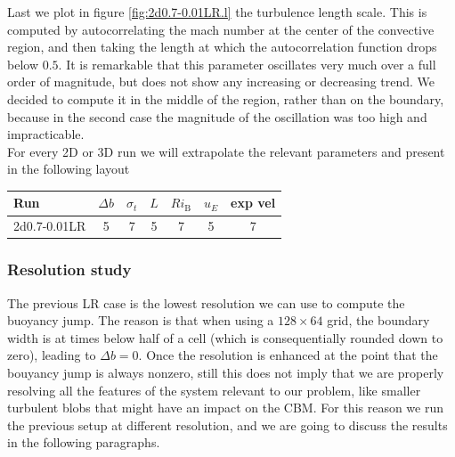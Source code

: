 Last we plot in figure \ref{fig:2d0.7-0.01LR.l} the turbulence length scale. This is computed by autocorrelating the mach number at the center of the convective region, and then taking the length at which the autocorrelation function drops below $0.5$. It is remarkable that this parameter oscillates very much over a full order of magnitude, but does not show any increasing or decreasing trend. We decided to compute it in the middle of the region, rather than on the boundary, because in the second case the magnitude of the oscillation was too high and impracticable. \\
For every 2D or 3D run we will extrapolate the relevant parameters and present in the following layout
\begin{center}
 \begin{tabular}{|l|c|c|c|c|c|c|}
	  \hline
	  Run & $\Delta b$ & $\sigma_t$ & $L$ & $Ri_{\mathrm{B}}$ & $u_E$ & exp vel\\
	  	\hline
		2d0.7-0.01LR & 5 & 7& 5 & 7& 5 & 7 \\ 
	      \hline
      \end{tabular}
 \end{center}

\subsubsection{Resolution study}
The previous LR case is the lowest resolution we can use to compute the buoyancy jump. The reason is that when using a $128 \times 64$ grid, the boundary width is at times below half of a cell (which is consequentially rounded down to zero), leading to $\Delta b =0$. Once the resolution is enhanced at the point that the bouyancy jump is always nonzero, still this does not imply that we are properly resolving all the features of the system relevant to our problem, like smaller turbulent blobs that might have an impact on the CBM. For this reason we run the previous setup at different resolution, and we are going to discuss the results in the following paragraphs.


